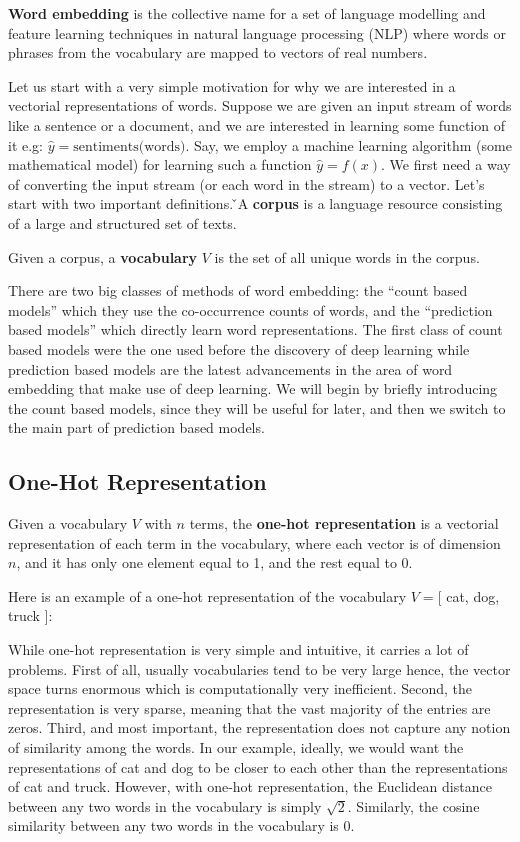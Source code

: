 \textbf{Word embedding} is the collective name for a set of language modelling and feature learning techniques in
natural language processing (NLP) where words or phrases from the vocabulary are mapped to vectors of real numbers.
\ed

Let us start with a very simple motivation for why we are interested in a vectorial representations of words. Suppose
we are given an input stream of words like a sentence or a document, and we are interested in learning some function
of it e.g: $\hat{y} = \text{sentiments(words)}$. Say, we employ a machine learning algorithm (some mathematical
model) for learning such a function $\hat{y} = f(x)$. We first need a way of converting the input stream (or each
word in the stream) to a vector. Let's start with two important definitions. \v

\bd[Corpus]
A \textbf{corpus} is a language resource consisting of a large and structured set of texts.
\ed

\bd[Vocabulary]
Given a corpus, a \textbf{vocabulary} $V$ is the set of all unique words in the corpus.
\ed

There are two big classes of methods of word embedding: the ``count based models'' which they use the co-occurrence
counts of words, and the ``prediction based models'' which directly learn word representations. The first class of
count based models were the one used before the discovery of deep learning while prediction based models are the
latest advancements in the area of word embedding that make use of deep learning. We will begin by briefly
introducing the count based models, since they will be useful for later, and then we switch to the main part of
prediction based models.

\subsection{One-Hot Representation}

Given a vocabulary $V$ with $n$ terms, the \textbf{one-hot representation} is a vectorial representation of each
term in the vocabulary, where each vector is of dimension $n$, and it has only one element equal to 1, and the rest
equal to 0.
\ed

\be
Here is an example of a one-hot representation of the vocabulary $V = [$ cat, dog, truck $]$:

\ee

While one-hot representation is very simple and intuitive, it carries a lot of problems. First of all, usually
vocabularies tend to be very large hence, the vector space turns enormous which is computationally very inefficient.
Second, the representation is very sparse, meaning that the vast majority of the entries are zeros. Third, and most
important, the representation does not capture any notion of similarity among the words. In our example, ideally, we
would want the representations of cat and dog to be closer to each other than the representations of cat and truck.
However, with one-hot representation, the Euclidean distance between any two words in the vocabulary is simply
$\sqrt{2}$. Similarly, the cosine similarity between any two words in the vocabulary is $0$.

